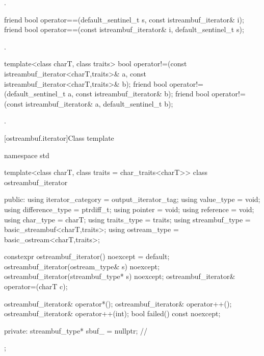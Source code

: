 \begin{itemdescr}
\pnum
\returns
{}.
\end{itemdescr}

%
\begin{itemdecl}
friend bool operator==(default_sentinel_t s, const istreambuf_iterator& i);
friend bool operator==(const istreambuf_iterator& i, default_sentinel_t s);
\end{itemdecl}

\begin{itemdescr}
\pnum
\returns {}.
\end{itemdescr}

%
\begin{itemdecl}
template<class charT, class traits>
  bool operator!=(const istreambuf_iterator<charT,traits>& a,
                  const istreambuf_iterator<charT,traits>& b);
friend bool operator!=(default_sentinel_t a, const istreambuf_iterator& b);
friend bool operator!=(const istreambuf_iterator& a, default_sentinel_t b);
\end{itemdecl}

\begin{itemdescr}
\pnum
\returns
{}.
\end{itemdescr}

[ostreambuf.iterator]{Class template }

%
\begin{codeblock}
namespace std {
  template<class charT, class traits = char_traits<charT>>
  class ostreambuf_iterator {
  public:
    using iterator_category = output_iterator_tag;
    using value_type        = void;
    using difference_type   = ptrdiff_t;
    using pointer           = void;
    using reference         = void;
    using char_type         = charT;
    using traits_type       = traits;
    using streambuf_type    = basic_streambuf<charT,traits>;
    using ostream_type      = basic_ostream<charT,traits>;

    constexpr ostreambuf_iterator() noexcept = default;
    ostreambuf_iterator(ostream_type& s) noexcept;
    ostreambuf_iterator(streambuf_type* s) noexcept;
    ostreambuf_iterator& operator=(charT c);

    ostreambuf_iterator& operator*();
    ostreambuf_iterator& operator++();
    ostreambuf_iterator& operator++(int);
    bool failed() const noexcept;

  private:
    streambuf_type* sbuf_ = nullptr;    // \expos
  };
}
\end{codeblock}

